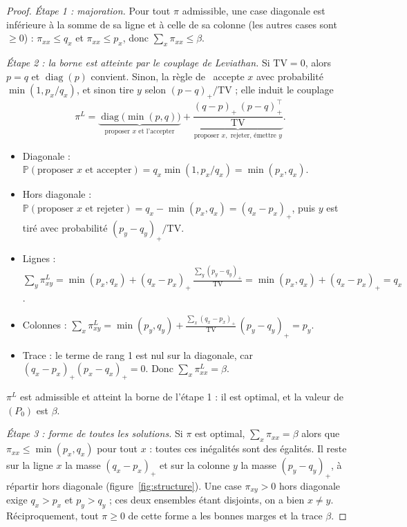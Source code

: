 \documentclass[11pt,a4paper]{article}
\newcommand{\TV}{\mathrm{TV}}
\newcommand{\Prob}{\mathbb{P}}
\newcommand{\diag}{\operatorname{diag}}
\theoremstyle{plain}
\theoremstyle{definition}
\begin{document}
\begin{proof}
\emph{Étape 1 : majoration.} Pour tout $\pi$ admissible, une case diagonale est inférieure à la somme de sa ligne et à celle de sa colonne (les autres cases sont $\ge0$) : $\pi_{xx}\le q_x$ et $\pi_{xx}\le p_x$, donc $\sum_x\pi_{xx}\le\beta$.

\emph{Étape 2 : la borne est atteinte par le couplage de Leviathan.} Si $\TV=0$, alors $p=q$ et $\diag(p)$ convient. Sinon, la règle de~\cite{leviathan} accepte $x$ avec probabilité $\min(1,p_x/q_x)$, et sinon tire $y$ selon $(p-q)_+/\TV$ ; elle induit le couplage
\[\pi^L=\underbrace{\diag\big(\min(p,q)\big)}_{\text{proposer }x\text{ et l'accepter}}+\underbrace{\frac{(q-p)_+\,(p-q)_+^{\top}}{\TV}}_{\text{proposer }x,\text{ rejeter, émettre }y}.\]
\begin{itemize}
\item Diagonale : $\Prob(\text{proposer }x\text{ et accepter})=q_x\min(1,p_x/q_x)=\min(p_x,q_x)$.
\item Hors diagonale : $\Prob(\text{proposer }x\text{ et rejeter})=q_x-\min(p_x,q_x)=(q_x-p_x)_+$, puis $y$ est tiré avec probabilité $(p_y-q_y)_+/\TV$.
\item Lignes : $\sum_y\pi^L_{xy}=\min(p_x,q_x)+(q_x-p_x)_+\,\frac{\sum_y(p_y-q_y)_+}{\TV}=\min(p_x,q_x)+(q_x-p_x)_+=q_x$.
\item Colonnes : $\sum_x\pi^L_{xy}=\min(p_y,q_y)+\frac{\sum_x(q_x-p_x)_+}{\TV}\,(p_y-q_y)_+=p_y$.
\item Trace : le terme de rang 1 est nul sur la diagonale, car $(q_x-p_x)_+(p_x-q_x)_+=0$. Donc $\sum_x\pi^L_{xx}=\beta$.
\end{itemize}
$\pi^L$ est admissible et atteint la borne de l'étape 1 : il est optimal, et la valeur de $(P_0)$ est $\beta$.

\emph{Étape 3 : forme de toutes les solutions.} Si $\pi$ est optimal, $\sum_x\pi_{xx}=\beta$ alors que $\pi_{xx}\le\min(p_x,q_x)$ pour tout $x$ : toutes ces inégalités sont des égalités. Il reste sur la ligne $x$ la masse $(q_x-p_x)_+$ et sur la colonne $y$ la masse $(p_y-q_y)_+$, à répartir hors diagonale (figure~\ref{fig:structure}). Une case $\pi_{xy}>0$ hors diagonale exige $q_x>p_x$ et $p_y>q_y$ ; ces deux ensembles étant disjoints, on a bien $x\ne y$. Réciproquement, tout $\pi\ge0$ de cette forme a les bonnes marges et la trace $\beta$.


\end{proof}
\end{document}
